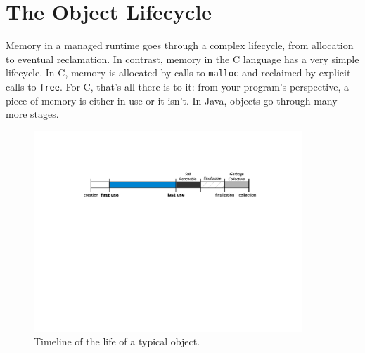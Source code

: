 

\section{The Object Lifecycle}

Memory in a managed runtime goes through a complex lifecycle, from allocation to
eventual reclamation. In contrast, memory in the C language has a very simple
lifecycle. In C, memory is allocated by calls to {\tt malloc} and reclaimed by
explicit calls to {\tt free}. For C, that's all there is to it: from your
program's perspective, a piece of memory is either in use or it isn't. In Java,
objects go through many more stages. 




\begin{figure}
	\includegraphics[width=0.9\textwidth]{part2/Figures/lifetime/object-lifecycle}
	\caption{Timeline of the life of a typical object.}
	\label{fig:typical-lifecycle}
\end{figure}


